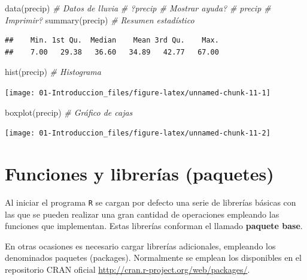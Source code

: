 \documentclass[
]{book}
\newenvironment{Shaded}{\begin{snugshade}}{\end{snugshade}}
\newcommand{\CommentTok}[1]{\textcolor[rgb]{0.56,0.35,0.01}{\textit{#1}}}
\newcommand{\FunctionTok}[1]{\textcolor[rgb]{0.00,0.00,0.00}{#1}}
\newcommand{\NormalTok}[1]{#1}
\theoremstyle{break}
\theoremstyle{nonumberplain}
\begin{document}
\begin{Shaded}
\begin{Highlighting}[]
\FunctionTok{data}\NormalTok{(precip)    }\CommentTok{\# Datos de lluvia}
\CommentTok{\# ?precip       \# Mostrar ayuda?}
\CommentTok{\# precip        \# Imprimir?}
\FunctionTok{summary}\NormalTok{(precip) }\CommentTok{\# Resumen estadístico}
\end{Highlighting}
\end{Shaded}

\begin{verbatim}
##    Min. 1st Qu.  Median    Mean 3rd Qu.    Max. 
##    7.00   29.38   36.60   34.89   42.77   67.00
\end{verbatim}

\begin{Shaded}
\begin{Highlighting}[]
\FunctionTok{hist}\NormalTok{(precip)    }\CommentTok{\# Histograma}
\end{Highlighting}
\end{Shaded}

\begin{center}\texttt{[image: 01-Introduccion\_files/figure-latex/unnamed-chunk-11-1]} \end{center}

\begin{Shaded}
\begin{Highlighting}[]
\FunctionTok{boxplot}\NormalTok{(precip) }\CommentTok{\# Gráfico de cajas}
\end{Highlighting}
\end{Shaded}

\begin{center}\texttt{[image: 01-Introduccion\_files/figure-latex/unnamed-chunk-11-2]} \end{center}

\hypertarget{funciones-paquetes}{%
\section{Funciones y librerías (paquetes)}\label{funciones-paquetes}}

Al iniciar el programa \texttt{R} se cargan por defecto una serie de librerías básicas con las que se pueden realizar una gran cantidad de operaciones empleando las funciones que implementan.
Estas librerías conforman el llamado \textbf{paquete base}.

En otras ocasiones es necesario cargar librerías adicionales, empleando los denominados paquetes (packages).
Normalmente se emplean los disponibles en el repositorio CRAN oficial
\url{http://cran.r-project.org/web/packages/}.
\end{document}
